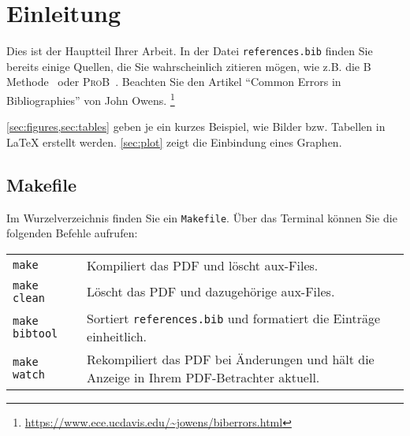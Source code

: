 %
%

\section{Einleitung}

Dies ist der Hauptteil Ihrer Arbeit.
In der Datei \texttt{references.bib} finden Sie bereits einige Quellen,
die Sie wahrscheinlich zitieren mögen,
wie z.B. die B Methode~\cite{abrial1996b,abrial2010modeling}
oder \textsc{ProB}~\cite{leuschel2003prob,leuschel2008prob}.
Beachten Sie den Artikel ``Common Errors in Bibliographies'' von John Owens.%
\footnote{\url{https://www.ece.ucdavis.edu/~jowens/biberrors.html}}

\cref{sec:figures,sec:tables}
geben je ein kurzes Beispiel,
wie Bilder bzw. Tabellen in \LaTeX{} erstellt werden.
\cref{sec:plot} zeigt die Einbindung eines Graphen.


\subsection{Makefile}

Im Wurzelverzeichnis finden Sie ein \texttt{Makefile}.
Über das Terminal können Sie die folgenden Befehle aufrufen:


\begin{tabularx}{\textwidth}{lX}
  \toprule
  \texttt{make} & Kompiliert das PDF und löscht aux-Files. \\
  \texttt{make clean} & Löscht das PDF und dazugehörige aux-Files. \\
  \texttt{make bibtool} & Sortiert \texttt{references.bib}
  und formatiert die Einträge einheitlich. \\
  \texttt{make watch} & Rekompiliert das PDF bei Änderungen und
  hält die Anzeige in Ihrem PDF-Betrachter aktuell. \\
  \bottomrule
\end{tabularx}


